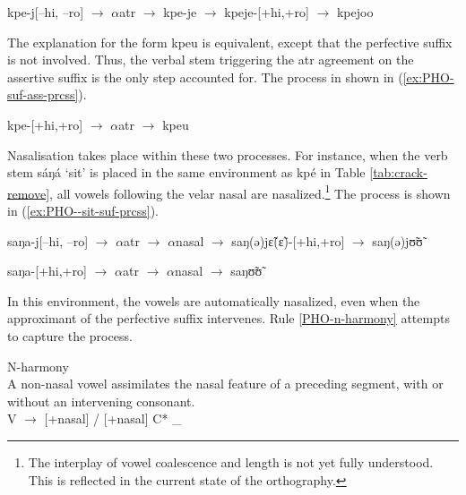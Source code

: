 \begin{exe}
\ex\label{ex:PHO-suf-perf-ass-prcss}
kpe-j[{\sc  --hi, --ro}]  $\rightarrow$  $\alpha${\sc atr} $\rightarrow$ kpe-je 
 $\rightarrow$
kpeje-[{\sc +hi,+ro}]  $\rightarrow$  kpejoo
\end{exe}

The explanation for the form {\sls kpeu} is equivalent, except that the
perfective suffix is not involved. Thus,  the verbal stem triggering the {\sc
atr} agreement on the assertive suffix is the only step  accounted
for. The process in shown in (\ref{ex:PHO-suf-ass-prcss}).


\begin{exe}
\ex\label{ex:PHO-suf-ass-prcss}
kpe-[{\sc +hi,+ro}]  $\rightarrow$  $\alpha${\sc atr} $\rightarrow$ kpeu
\end{exe}

Nasalisation takes place within these two processes. For instance, when the verb 
stem {\sls sáŋá} `sit' is placed in the same environment as {\sls kpé} in 
Table 
\ref{tab:crack-remove}, all vowels following the velar nasal are 
nasalized.\footnote{The interplay of vowel coalescence and  length is not yet 
fully understood. This is reflected in the current state of the orthography.}  
The process is shown in (\ref{ex:PHO--sit-suf-prcss}).

\begin{exe}
\ex\label{ex:PHO--sit-suf-prcss}
\begin{xlist}

\ex\label{ex:PHO-sit-suf-perf-ass-prcss}
 saŋa-j[{\sc  --hi, --ro}]  $\rightarrow$   $\alpha${\sc atr} $\rightarrow$  
$\alpha${\sc nasal}
$\rightarrow$  saŋ(ə)jɛ̃(ɛ̃)-[{\sc +hi,+ro}]  $\rightarrow$  saŋ(ə)jʊ̃ʊ̃

\ex\label{ex:PHO--sit-suf-ass-prcss}
saŋa-[{\sc +hi,+ro}]   $\rightarrow$  $\alpha${\sc atr}  $\rightarrow$  
$\alpha${\sc nasal} $\rightarrow$ saŋʊ̃ʊ̃
\end{xlist}
\end{exe}

In this environment, the vowels are  automatically nasalized, even when the
approximant of the perfective suffix intervenes. Rule \ref{PHO-n-harmony}
attempts to capture the process.

\begin{Rule}\label{PHO-n-harmony}{N-harmony}\\
A non-nasal vowel assimilates the nasal feature of a preceding segment, with or
without an intervening consonant. \\
 V $\rightarrow$  [{\sc +nasal}] /  [{\sc +nasal}] C*  \_  
\end{Rule}




